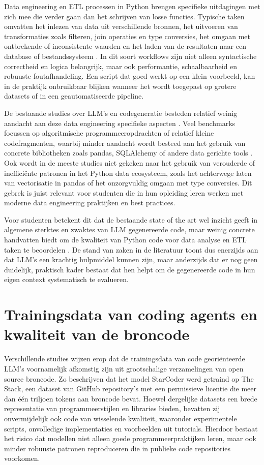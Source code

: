 Data engineering en ETL processen in Python brengen specifieke uitdagingen met zich mee die verder gaan dan het schrijven van losse functies. Typische taken omvatten het inlezen van data uit verschillende bronnen, het uitvoeren van transformaties zoals filteren, join operaties en type conversies, het omgaan met ontbrekende of inconsistente waarden en het laden van de resultaten naar een database of bestandssysteem \autocite{Nascimento2024}. In dit soort workflows zijn niet alleen syntactische correctheid en logica belangrijk, maar ook performantie, schaalbaarheid en robuuste foutafhandeling. Een script dat goed werkt op een klein voorbeeld, kan in de praktijk onbruikbaar blijken wanneer het wordt toegepast op grotere datasets of in een geautomatiseerde pipeline.

De bestaande studies over LLM's en codegeneratie besteden relatief weinig aandacht aan deze data engineering specifieke aspecten \autocite{Li2023,Ni2024}. Veel benchmarks focussen op algoritmische programmeeropdrachten of relatief kleine codefragmenten, waarbij minder aandacht wordt besteed aan het gebruik van concrete bibliotheken zoals pandas, SQLAlchemy of andere data gerichte tools \autocite{Ni2024}. Ook wordt in de meeste studies niet gekeken naar het gebruik van verouderde of inefficiënte patronen in het Python data ecosysteem, zoals het achterwege laten van vectorisatie in pandas of het onzorgvuldig omgaan met type conversies. Dit gebrek is juist relevant voor studenten die in hun opleiding leren werken met moderne data engineering praktijken en best practices.

Voor studenten betekent dit dat de bestaande state of the art wel inzicht geeft in algemene sterktes en zwaktes van LLM gegenereerde code, maar weinig concrete handvatten biedt om de kwaliteit van Python code voor data analyse en ETL taken te beoordelen \autocite{Li2023,Esfahani2024}. De stand van zaken in de literatuur toont dus enerzijds aan dat LLM's een krachtig hulpmiddel kunnen zijn, maar anderzijds dat er nog geen duidelijk, praktisch kader bestaat dat hen helpt om de gegenereerde code in hun eigen context systematisch te evalueren.

\section{Trainingsdata van coding agents en kwaliteit van de broncode}

Verschillende studies wijzen erop dat de trainingsdata van code georiënteerde LLM’s voornamelijk afkomstig zijn uit grootschalige verzamelingen van open source broncode. Zo beschrijven \textcite{Li2023} dat het model StarCoder werd getraind op The Stack, een dataset van GitHub repository's met een permissieve licentie die meer dan één triljoen tokens aan broncode bevat. Hoewel dergelijke datasets een brede representatie van programmeerstijlen en libraries bieden, bevatten zij onvermijdelijk ook code van wisselende kwaliteit, waaronder experimentele scripts, onvolledige implementaties en voorbeelden uit tutorials. Hierdoor bestaat het risico dat modellen niet alleen goede programmeerpraktijken leren, maar ook minder robuuste patronen reproduceren die in publieke code repositories voorkomen.


